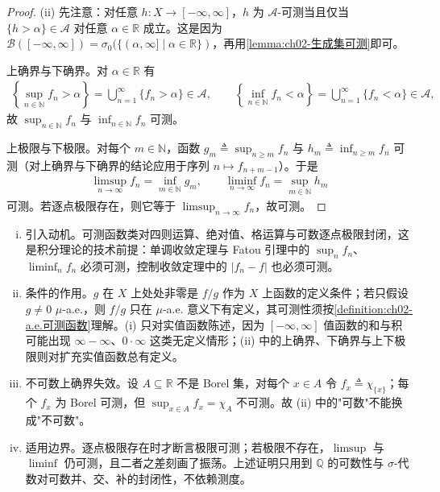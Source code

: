 \documentclass[../../main.tex]{subfiles}%
\begin{document}
\begin{proof}
(ii) 先注意：对任意 $h:X\to[-\infty,\infty]$，$h$ 为 $\mathscr A$-可测当且仅当 $\{h>\alpha\}\in\mathscr A$ 对任意 $\alpha\in\mathbb{R}$ 成立。这是因为 $\mathscr B([-\infty,\infty])=\sigma_0(\{(\alpha,\infty]\mid\alpha\in\mathbb{R}\})$，再用\cref{lemma:ch02-生成集可测}即可。

上确界与下确界。对 $\alpha\in\mathbb{R}$ 有
\begin{align*}
\left\{\sup_{n\in\mathbb{N}}f_n>\alpha\right\}=\bigcup_{n=1}^\infty\{f_n>\alpha\}\in\mathscr A,
\qquad
\left\{\inf_{n\in\mathbb{N}}f_n<\alpha\right\}=\bigcup_{n=1}^\infty\{f_n<\alpha\}\in\mathscr A,
\end{align*}
故 $\sup_{n\in\mathbb{N}}f_n$ 与 $\inf_{n\in\mathbb{N}}f_n$ 可测。

上极限与下极限。对每个 $m\in\mathbb{N}$，函数 $g_m\triangleq\sup_{n\geqslant m}f_n$ 与 $h_m\triangleq\inf_{n\geqslant m}f_n$ 可测（对上确界与下确界的结论应用于序列 $n\mapsto f_{n+m-1}$）。于是
\begin{align*}
\limsup_{n\to\infty}f_n=\inf_{m\in\mathbb{N}}g_m,\qquad
\liminf_{n\to\infty}f_n=\sup_{m\in\mathbb{N}}h_m
\end{align*}
可测。若逐点极限存在，则它等于 $\limsup_{n\to\infty}f_n$，故可测。
\end{proof}

\begin{remark}\label{remark:ch02-可测运算}
\begin{enumerate}[(i)]
\item 引入动机。可测函数类对四则运算、绝对值、格运算与可数逐点极限封闭，这是积分理论的技术前提：单调收敛定理与 Fatou 引理中的 $\sup_n f_n$、$\liminf_n f_n$ 必须可测，控制收敛定理中的 $|f_n-f|$ 也必须可测。
\item 条件的作用。$g$ 在 $X$ 上处处非零是 $f/g$ 作为 $X$ 上函数的定义条件；若只假设 $g\neq0$ $\mu$-a.e.，则 $f/g$ 只在 $\mu$-a.e. 意义下有定义，其可测性须按\cref{definition:ch02-a.e.可测函数}理解。(i) 只对实值函数陈述，因为 $[-\infty,\infty]$ 值函数的和与积可能出现 $\infty-\infty$、$0\cdot\infty$ 这类无定义情形；(ii) 中的上确界、下确界与上下极限则对扩充实值函数总有定义。
\item 不可数上确界失效。设 $A\subseteq\mathbb{R}$ 不是 Borel 集，对每个 $x\in A$ 令 $f_x\triangleq\chi_{\{x\}}$；每个 $f_x$ 为 Borel 可测，但 $\sup_{x\in A}f_x=\chi_A$ 不可测。故 (ii) 中的"可数"不能换成"不可数"。
\item 适用边界。逐点极限存在时才断言极限可测；若极限不存在，$\limsup$ 与 $\liminf$ 仍可测，且二者之差刻画了振荡。上述证明只用到 $\mathbb{Q}$ 的可数性与 $\sigma$-代数对可数并、交、补的封闭性，不依赖测度。
\end{enumerate}
\end{remark}
\end{document}
